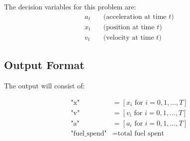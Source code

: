 \documentclass{article}
\begin{document}
The decision variables for this problem are:
\[
\begin{align*}
a_t & \quad \text{(acceleration at time } t\text{)} \\
x_t & \quad \text{(position at time } t\text{)} \\
v_t & \quad \text{(velocity at time } t\text{)}
\end{align*}
\]

\subsection*{Output Format}

The output will consist of:

\begin{align*}
\text{"x"} & = [x_i \text{ for } i = 0, 1, \ldots, T] \\
\text{"v"} & = [v_i \text{ for } i = 0, 1, \ldots, T] \\
\text{"a"} & = [a_i \text{ for } i = 0, 1, \ldots, T] \\
\text{"fuel\_spend"} & = \text{total fuel spent}
\end{align*}
\end{document}

